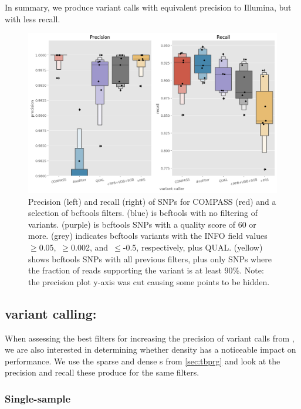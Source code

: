 In summary, we produce \ont{} variant calls with equivalent precision to Illumina, but with less recall.

\begin{figure}
\begin{center}
\includegraphics[width=0.90\columnwidth]{Chapter2/Figs/bcftools-precision-recall-filters.png}
\caption{{Precision (left) and recall (right) of SNPs for COMPASS (red) and a
selection of bcftools filters.  (blue) is bcftools with no
filtering of variants.  (purple) is bcftools SNPs with a quality score of
60 or more.  (grey) indicates bcftools variants with the INFO
field values~\(\ge\)0.05,~\(\ge\)0.002,
and~\(\le\)-0.5, respectively, plus QUAL.  (yellow) shows
bcftools SNPs with all previous filters, plus only SNPs where the
fraction of reads supporting the variant is at least 90\%. Note: the
precision plot y-axis was cut causing some  points to be
hidden.
{\label{fig:bcftools-filters}}
}}
\end{center}
\end{figure}

\subsection{\ont{} variant calling: \pandora{}}
\label{sec:pandora-filters}

When assessing the best filters for increasing the precision of variant calls from \pandora{}, we are also interested in determining whether \prg{} density has a noticeable impact on performance. We use the sparse and dense \prg{}s from \autoref{sec:tbprg} and look at the precision and recall these produce for the same filters.

\subsubsection{Single-sample}
\label{sec:map-var-calls}

